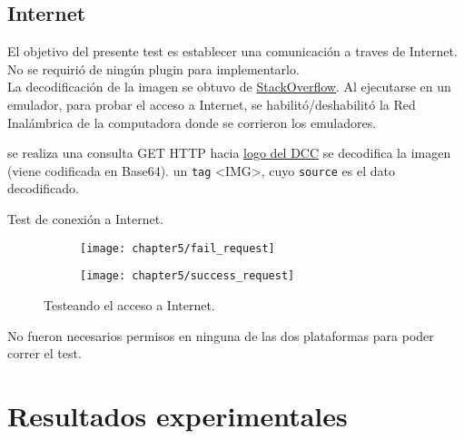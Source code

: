 \subsection{Internet}
El objetivo del presente test es establecer una comunicación a traves de Internet. No se requirió de ningún plugin para implementarlo.\\
La decodificación de la imagen se obtuvo de \href{https://stackoverflow.com/questions/19124701/get-image-using-jquery-ajax-and-decode-it-to-base64/25371174#25371174}{StackOverflow}. Al ejecutarse en un emulador, para probar el acceso a Internet, se habilitó/deshabilitó la Red Inalámbrica de la computadora donde se corrieron los emuladores.\\
\begin{algorithm}
	\begin{algorithmic}[1]
		\STATE se realiza una consulta GET HTTP hacia \href{https://dcc.fceia.unr.edu.ar/sites/all/themes/birthofcool/images/logo-lcc.png}{logo del DCC}
		\STATE se decodifica la imagen (viene codificada en Base64).
		\RETURN un \texttt{tag} \textless IMG\textgreater, cuyo \texttt{source} es el dato decodificado.
	\end{algorithmic}
	\caption{Test de conexión a Internet.}\label{alg:chap5_test_internet}
\end{algorithm}
\begin{figure}[hbtp]
    \centering
    \begin{subfigure}{.3\linewidth}
		\texttt{[image: chapter5/fail\_request]}
		\label{fig:ch05:fail_request}
	\end{subfigure}
	\begin{subfigure}{.3\linewidth}
		\texttt{[image: chapter5/success\_request]}
		\label{fig:ch05:success_request}
	\end{subfigure}
	\caption{Testeando el acceso a Internet.}
	\label{fig:ch05:internet_test}
\end{figure}
No fueron necesarios permisos en ninguna de las dos plataformas para poder correr el test.
\section{Resultados experimentales}
